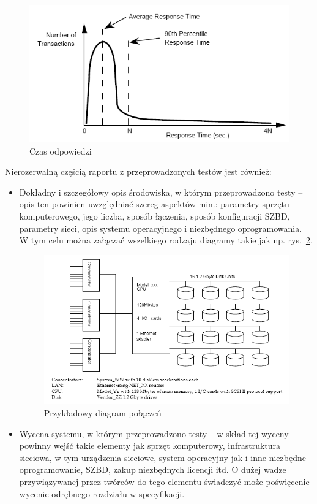 \begin{figure}[h]
\begin{center}
\includegraphics[width=0.8\linewidth]{figures/tpc/tpc_required_reporting1.png}
\end{center}
\caption{Czas odpowiedzi\cite{TPC2}}\label{rys:tpc_required_reporting1}
\end{figure}

Nierozerwalną częścią raportu z przeprowadzonych testów jest również:
\begin{itemize}
\item Dokładny i szczegółowy opis środowiska, w którym przeprowadzono testy -- opis ten powinien uwzględniać szereg aspektów
min.: parametry sprzętu komputerowego, jego liczba, sposób łączenia, sposób konfiguracji SZBD, parametry sieci, opis
systemu operacyjnego i niezbędnego oprogramowania. W tym celu można załączać wszelkiego rodzaju diagramy takie jak np. rys.~\ref{rys:tpc_full_disclosure1}.
\begin{figure}[h]
\begin{center}
\includegraphics[width=0.8\linewidth]{figures/tpc/tpc_full_disclosure1.png}
\end{center}
\caption{Przykładowy diagram połączeń\cite{TPC2}}\label{rys:tpc_full_disclosure1}
\end{figure}
\item Wycena systemu, w którym przeprowadzono testy -- w skład tej wyceny powinny wejść takie elementy jak sprzęt komputerowy, 
infrastruktura sieciowa, w tym urządzenia sieciowe, system operacyjny jak i inne niezbędne oprogramowanie, SZBD, 
zakup niezbędnych licencji itd. O dużej wadze przywiązywanej przez twórców do tego elementu
świadczyć może poświęcenie wycenie odrębnego rozdziału w specyfikacji.
\end{itemize}

